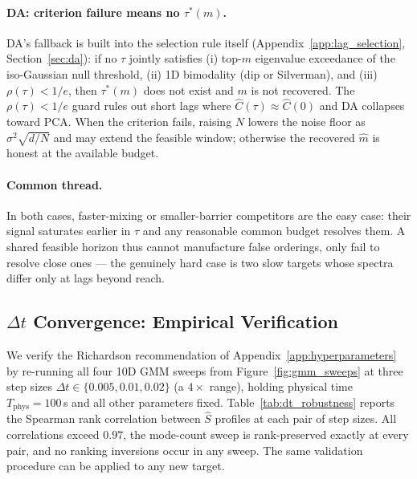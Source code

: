 \documentclass{article}
\begin{document}
\paragraph{DA: criterion failure means no $\tau^*(m)$.}
DA's fallback is built into the selection rule itself
(Appendix~\ref{app:lag_selection}, Section~\ref{sec:da}): if no
$\tau$ jointly satisfies (i) top-$m$ eigenvalue exceedance of the
iso-Gaussian null threshold, (ii) 1D bimodality (dip or Silverman),
and (iii) $\rho(\tau) < 1/e$, then $\tau^*(m)$ does not exist and
$m$ is not recovered. The $\rho(\tau) < 1/e$ guard rules out short
lags where $\hat C(\tau) \approx \hat C(0)$ and DA collapses
toward PCA. When the criterion fails, raising $N$ lowers the noise
floor as $\sigma^2\sqrt{d/N}$ and may extend the feasible window;
otherwise the recovered $\hat m$ is honest at the available budget.

\paragraph{Common thread.}
In both cases, faster-mixing or smaller-barrier competitors are the easy case: their signal saturates earlier in $\tau$ and any reasonable common budget resolves them. A shared feasible horizon thus cannot manufacture false orderings, only fail to resolve close ones — the genuinely hard case is two slow targets whose spectra differ only at lags beyond reach.

\subsection{$\Delta t$ Convergence: Empirical Verification}
\label{app:dt_robustness}

We verify the Richardson recommendation of
Appendix~\ref{app:hyperparameters} by re-running all four 10D GMM
sweeps from Figure~\ref{fig:gmm_sweeps} at three step sizes
$\Delta t \in \{0.005, 0.01, 0.02\}$ (a $4\times$ range), holding
physical time $T_{\mathrm{phys}} = 100$\,s and all other parameters
fixed. Table~\ref{tab:dt_robustness} reports the Spearman rank
correlation between $\hat S$ profiles at each pair of step sizes.
All correlations exceed $0.97$, the mode-count sweep is rank-preserved
exactly at every pair, and no ranking inversions occur in any sweep.
The same validation procedure can be applied to any new target.
\end{document}

